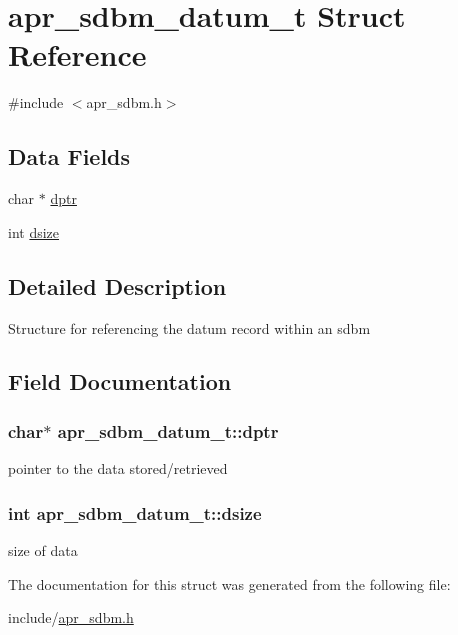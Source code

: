 \hypertarget{structapr__sdbm__datum__t}{\section{apr\-\_\-sdbm\-\_\-datum\-\_\-t Struct Reference}
\label{structapr__sdbm__datum__t}
}


{\ttfamily \#include $<$apr\-\_\-sdbm.\-h$>$}

\subsection*{Data Fields}
\begin{DoxyCompactItemize}
\item 
char $\ast$ \hyperlink{structapr__sdbm__datum__t_a927c668d3912a4cc8466b0f551d00169}{dptr}
\item 
int \hyperlink{structapr__sdbm__datum__t_aedbd0295ba540695d5b407f1dec90eb5}{dsize}
\end{DoxyCompactItemize}


\subsection{Detailed Description}
Structure for referencing the datum record within an sdbm 

\subsection{Field Documentation}
\hypertarget{structapr__sdbm__datum__t_a927c668d3912a4cc8466b0f551d00169}{
\subsubsection[{dptr}]{\setlength{\rightskip}{0pt plus 5cm}char$\ast$ apr\-\_\-sdbm\-\_\-datum\-\_\-t\-::dptr}}\label{structapr__sdbm__datum__t_a927c668d3912a4cc8466b0f551d00169}
pointer to the data stored/retrieved \hypertarget{structapr__sdbm__datum__t_aedbd0295ba540695d5b407f1dec90eb5}{
\subsubsection[{dsize}]{\setlength{\rightskip}{0pt plus 5cm}int apr\-\_\-sdbm\-\_\-datum\-\_\-t\-::dsize}}\label{structapr__sdbm__datum__t_aedbd0295ba540695d5b407f1dec90eb5}
size of data 

The documentation for this struct was generated from the following file\-:\begin{DoxyCompactItemize}
\item 
include/\hyperlink{apr__sdbm_8h}{apr\-\_\-sdbm.\-h}\end{DoxyCompactItemize}
